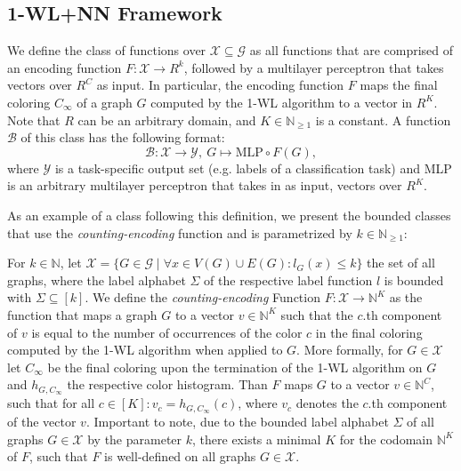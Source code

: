 \documentclass[11pt, dvipsnames, DIV=12]{scrreprt}
\theoremstyle{definition}
\newcommand{\Nb}{\mathbb{N}}
\newcommand{\wlnn}{\text{1-WL+NN }}
\begin{document}
\subsection{1-WL+NN Framework}\label{sec:1-WL+NN Definition}
We define the class \wlnn of functions over $\mathcal{X} \subseteq \mathcal{G}$ as all functions that are comprised of an encoding function $F: \mathcal{X} \rightarrow R^k$, followed by a multilayer perceptron that takes vectors over $R^C$ as input. In particular, the encoding function $F$ maps the final coloring $C_\infty$ of a graph $G$ computed by the 1-WL algorithm to a vector in $R^K$. Note that $R$ can be an arbitrary domain, and $K \in \Nb_{\geq 1}$ is a constant. A function $\mathcal{B}$ of this class has the following format:
\begin{equation*}
    \mathcal{B}: \mathcal{X} \rightarrow \mathcal{Y}, \ G \mapsto \text{MLP} \circ F(G),
\end{equation*}
where $\mathcal{Y}$ is a task-specific output set (e.g. labels of a classification task) and MLP is an arbitrary multilayer perceptron that takes in as input, vectors over $R^K$. 


As an example of a class following this definition, we present the bounded \wlnn classes that use the \emph{counting-encoding} function and is parametrized by $k \in \Nb_{\geq 1}$:

For $k \in \mathbb{N}$, let $\mathcal{X} = \{ G \in \mathcal{G} \mid \forall x \in V(G) \cup E(G): l_G(x) \leq k \}$ the set of all graphs, where the label alphabet $\Sigma$ of the respective label function $l$ is bounded with $\Sigma \subseteq [k]$. We define the \emph{counting-encoding} Function $F: \mathcal{X} \rightarrow \mathbb{N}^K$ as the function that maps a graph $G$ to a vector $v \in \mathbb{N}^K$ such that the $c$.th component of $v$ is equal to the number of occurrences of the color $c$ in the final coloring computed by the 1-WL algorithm when applied to $G$. More formally, for $G \in \mathcal{X}$ let $C_\infty$ be the final coloring upon the termination of the 1-WL algorithm on $G$ and $h_{G, C_\infty}$ the respective color histogram. Than $F$ maps $G$ to a vector $v \in \mathbb{N}^C$, such that for all $c \in [K]: v_c = h_{G, C_\infty}(c)$, where $v_c$ denotes the $c$.th component of the vector $v$. Important to note, due to the bounded label alphabet $\Sigma$ of all graphs $G 
\in \mathcal{X}$ by the parameter $k$, there exists a minimal $K$ for the codomain $\Nb^K$ of $F$, such that $F$ is well-defined on all graphs $G \in \mathcal{X}$.
\end{document}
